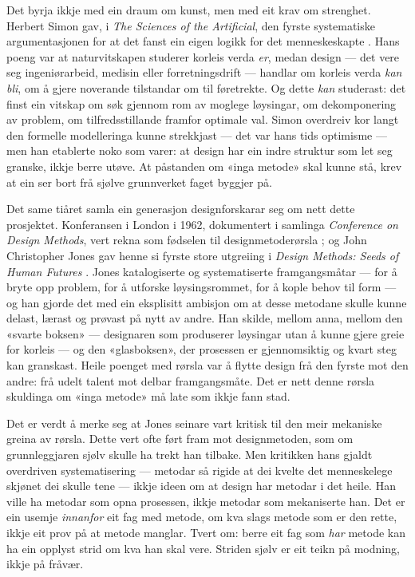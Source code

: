 Det byrja ikkje med ein draum om kunst, men med eit krav om strenghet. Herbert Simon gav, i \textit{The Sciences of the Artificial}, den fyrste systematiske argumentasjonen for at det fanst ein eigen logikk for det menneskeskapte \autocite{simon1969sciences}. Hans poeng var at naturvitskapen studerer korleis verda \emph{er}, medan design — det vere seg ingeniørarbeid, medisin eller forretningsdrift — handlar om korleis verda \emph{kan bli}, om å gjere noverande tilstandar om til føretrekte. Og dette \emph{kan} studerast: det finst ein vitskap om søk gjennom rom av moglege løysingar, om dekomponering av problem, om tilfredsstillande framfor optimale val. Simon overdreiv kor langt den formelle modelleringa kunne strekkjast — det var hans tids optimisme — men han etablerte noko som varer: at design har ein indre struktur som let seg granske, ikkje berre utøve. At påstanden om «inga metode» skal kunne stå, krev at ein ser bort frå sjølve grunnverket faget byggjer på.

Det same tiåret samla ein generasjon designforskarar seg om nett dette prosjektet. Konferansen i London i 1962, dokumentert i samlinga \textit{Conference on Design Methods}, vert rekna som fødselen til designmetoderørsla \autocite{jones1963conference}; og John Christopher Jones gav henne si fyrste store utgreiing i \textit{Design Methods: Seeds of Human Futures} \autocite{jones1970methods}. Jones katalogiserte og systematiserte framgangsmåtar — for å bryte opp problem, for å utforske løysingsrommet, for å kople behov til form — og han gjorde det med ein eksplisitt ambisjon om at desse metodane skulle kunne delast, lærast og prøvast på nytt av andre. Han skilde, mellom anna, mellom den «svarte boksen» — designaren som produserer løysingar utan å kunne gjere greie for korleis — og den «glasboksen», der prosessen er gjennomsiktig og kvart steg kan granskast. Heile poenget med rørsla var å flytte design frå den fyrste mot den andre: frå udelt talent mot delbar framgangsmåte. Det er nett denne rørsla skuldinga om «inga metode» må late som ikkje fann stad.

Det er verdt å merke seg at Jones seinare vart kritisk til den meir mekaniske greina av rørsla. Dette vert ofte ført fram mot designmetoden, som om grunnleggjaren sjølv skulle ha trekt han tilbake. Men kritikken hans gjaldt overdriven systematisering — metodar så rigide at dei kvelte det menneskelege skjønet dei skulle tene — ikkje ideen om at design har metodar i det heile. Han ville ha metodar som opna prosessen, ikkje metodar som mekaniserte han. Det er ein usemje \emph{innanfor} eit fag med metode, om kva slags metode som er den rette, ikkje eit prov på at metode manglar. Tvert om: berre eit fag som \emph{har} metode kan ha ein opplyst strid om kva han skal vere. Striden sjølv er eit teikn på modning, ikkje på fråvær.

